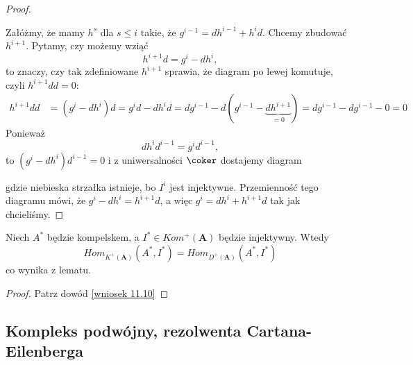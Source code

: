 \begin{proof}
  \begin{center}\end{center}
  Załóżmy, że mamy $h^s$ dla $s\leq i$ takie, że $g^{i-1}=dh^{i-1}+h^id$. Chcemy zbudować $h^{i+1}$.
  Pytamy, czy możemy wziąć
  $$h^{i+1}d=g^i-dh^i,$$
  to znaczy, czy tak zdefiniowane $h^{i+1}$ sprawia, że diagram po lewej komutuje, czyli $h^{i+1}dd=0$:
  \begin{align*}
    h^{i+1}dd&=(g^i-dh^i)d=g^id-dh^id=dg^{i-1}-d(g^{i-1}-\underbrace{dh^{i+1}}_{=0})=dg^{i-1}-dg^{i-1}-0=0
  \end{align*}
  Ponieważ
  $$dh^id^{i-1}=g^id^{i-1},$$
  to $(g^i-dh^i)d^{i-1}=0$ i z uniwersalności $\coker$ dostajemy diagram
  \begin{center}\end{center}
  gdzie niebieska strzałka istnieje, bo $I^i$ jest injektywne. Przemienność tego diagramu mówi, że $g^i-dh^i=h^{i+1}d$, a więc $g^i=dh^i+h^{i+1}d$ tak jak chcieliśmy.
\end{proof}

\begin{conclusion}\label{wniosek 12.2}
  Niech $A^*$ będzie kompelskem, a $I^*\in Kom^+(\mathbf{A})$ będzie injektywny. Wtedy 
  $$Hom_{K^+(\mathbf{A})}(A^*, I^*)=Hom_{D^+(\mathbf{A})}(A^*, I^*)$$
  co wynika z lematu.
\end{conclusion}

\begin{proof}Patrz dowód \ref{wniosek 11.10}
\end{proof}

\subsection{Kompleks podwójny, rezolwenta Cartana-Eilenberga}

